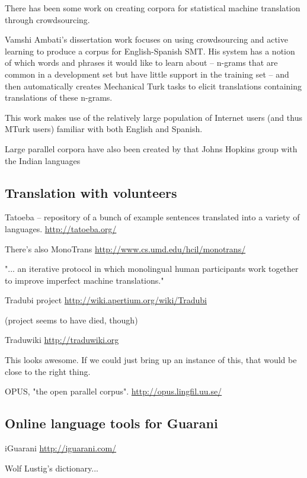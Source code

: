 There has been some work on creating corpora for statistical machine
translation through crowdsourcing.

Vamshi Ambati's dissertation work focuses on using crowdsourcing and active
learning to produce a corpus for English-Spanish SMT. His system has a notion
of which words and phrases it would like to learn about -- n-grams that are
common in a development set but have little support in the training set -- and
then automatically creates Mechanical Turk tasks to elicit translations
containing translations of these n-grams.

This work makes use of the relatively large population of Internet users (and
thus MTurk users) familiar with both English and Spanish.

\cite{ambati_naacl}

\cite{ambati_act}

Large parallel corpora have also been created by that Johns Hopkins group
with the Indian languages
\cite{post-callisonburch-osborne:2012:WMT}

\subsection{Translation with volunteers}

Tatoeba -- repository of a bunch of example sentences translated into a variety
of languages.
\url{http://tatoeba.org/}

There's also MonoTrans
\url{http://www.cs.umd.edu/hcil/monotrans/}

"... an iterative protocol in which monolingual human participants work
together to improve imperfect machine translations." 

Tradubi project
\url{http://wiki.apertium.org/wiki/Tradubi}

(project seems to have died, though)

Traduwiki
\url{http://traduwiki.org}

This looks awesome. If we could just bring up an instance of this, that would
be close to the right thing.

OPUS, "the open parallel corpus".
\url{http://opus.lingfil.uu.se/}

\subsection{Online language tools for Guarani}

iGuarani
\url{http://iguarani.com/}

Wolf Lustig's dictionary...

